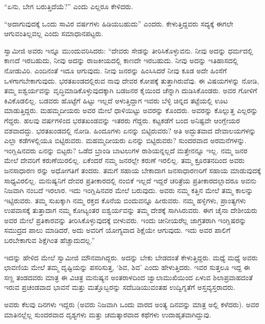 “ಏನು, ಬೇಗ ಬರುತ್ತಿದೆಯೆ?” ಎಂದು ಎಲ್ಲರೂ ಕೇಳಿದರು.

“ಅದಾಗುವುದಕ್ಕೆ ಒಂದು ಸಾವಿರ ವರ್ಷಗಳು ಹಿಡಿಯಬಹುದು” ಎಂದರು. ಕೇಳುತ್ತಿದ್ದವರು ಸದ್ಯಕ್ಕೆ ಈಗಲೇ ಆಗುವಂತಿಲ್ಲವಲ್ಲ ಎಂದು ಸಮಾಧಾನಪಟ್ಟರು.

ಸ್ವಾಮೀಜಿ ಅವರು ಇನ್ನೂ ಮುಂದುವರಿಸಿದರು: “ದೇವರು ಸೇಡನ್ನು ತೀರಿಸಿಕೊಳ್ಳುವನು. ನೀವು ಅದನ್ನು ಧರ್ಮದಲ್ಲಿ ಕಾಣದೆ ಇರಬಹುದು, ನೀವು ಅದನ್ನು ರಾಜಕೀಯದಲ್ಲಿ ಕಾಣದೇ ಇರಬಹುದು. ನೀವು ಅದನ್ನು ಇತಿಹಾಸದಲ್ಲಿ ನೋಡುವಿರಿ. ಎಂದಿನಂತೆ ಇದೂ ಆಗುವುದು. ನೀವು ಜನರನ್ನು ಹಿಂಸಿಸಿದರೆ ನೀವು ಕೂಡ ಅದೇ ಹಿಂಸೆಗೆ ಒಳಗಾಗಬೇಕಾಗುವುದು. ಭರತಖಂಡದಲ್ಲಿರುವ ನಾವು ದೇವರ ಕೋಪಕ್ಕೆ ತುತ್ತಾಗಿರುವೆವು. ಈ ವಿಷಯಗಳನ್ನು ನೋಡಿ, ತಮ್ಮ ಐಶ್ವರ್ಯವನ್ನು ವೃದ್ಧಿಮಾಡಿಕೊಳ್ಳುವುದಕ್ಕಾಗಿ ಬಡಜನರ ಕೈಯಿಂದ ಚೆನ್ನಾಗಿ ದುಡಿಸಿಕೊಂಡರು. ಅವರ ಗೋಳಿಗೆ ಕಿವಿಕೊಡಲಿಲ್ಲ. ಬಡವರು ಹೊಟ್ಟೆಗೆ ಹಿಟ್ಟು ಇಲ್ಲದೆ ಅಳುತ್ತಿದ್ದಾಗ ಇವರು ಬೆಳ್ಳಿ ಚಿನ್ನದ ತಟ್ಟೆಯಲ್ಲಿ ಊಟ ಮಾಡುತ್ತಿದ್ದರು. ಮಹಮ್ಮದೀಯರು ಅವರ ಮೇಲೆ ಧಾಳಿಯಿಟ್ಟು ಅವರನ್ನು ಕೊಂದರು. ಅವರನ್ನು ಕೊಲ್ಲುತ್ತ ಎಲ್ಲರನ್ನು ಗೆದ್ದರು. ಹಲವು ವರ್ಷಗಳಿಂದ ಭರತಖಂಡವನ್ನು ಇತರರು ಗೆದ್ದರು. ಕಟ್ಟಕಡೆಗೆ ಬಂದ ಅನಿಷ್ಟವೇ ಆಂಗ್ಲೇಯರ ವಶವಾದದ್ದು. ಭರತಖಂಡದಲ್ಲಿ ನೋಡಿ. ಹಿಂದೂಗಳು ಏನನ್ನು ಬಿಟ್ಟಿರುವರು? ಅತಿ ಅದ್ಭುತವಾದ ದೇವಾಲಯಗಳನ್ನು ಎಲ್ಲಾ ಕಡೆಗಳಲ್ಲಿಯೂ ಬಿಟ್ಟಿರುವರು. ಮಹಮ್ಮದೀಯರು ಏನನ್ನು ಬಿಟ್ಟಿರುವರು? ಸುಂದರವಾದ ಅರಮನೆಗಳನ್ನು. ಇಂಗ್ಲಿಷಿನವರು ಏನನ್ನು ಬಿಟ್ಟರು? ಒಡೆದ ಬ್ರಾಂಡಿ ಬಾಟಲುಗಳ ರಾಶಿಯನ್ನಲ್ಲದೆ ಮತ್ತೇನನ್ನೂ ಇಲ್ಲ. ನಮ್ಮ ಜನರ ಮೇಲೆ ದೇವರಿಗೆ ಕರುಣೆಯಿರಲಿಲ್ಲ. ಏಕೆಂದರೆ ನಮ್ಮ ಜನರಲ್ಲೇ ಕರುಣೆ ಇರಲಿಲ್ಲ. ತಮ್ಮ ಕ್ರೂರತನದಿಂದ ಅವರು ಜನಸಾಧಾರಣ ರನ್ನು ಅಧೋಗತಿಗೆ ತಂದರು. ತಮಗೆ ಸಹಾಯ ಬೇಕಾದಾಗ ಜನಸಾಧಾರಣರಿಗೆ ಸಹಾಯ ಮಾಡುವುದಕ್ಕೆ ಸಾಧ್ಯವಿರಲಿಲ್ಲ. ಮನುಷ್ಯನಿಗೆ ದೇವರ ಪ್ರತೀಕಾರದಲ್ಲಿ ನಂಬಿಕೆ ಇಲ್ಲದೆ ಇದ್ದರೆ ಚರಿತ್ರೆಯ ಪ್ರತೀಕಾರದಲ್ಲಾದರೂ ಅವನು ನಿಜವಾಗಿ ನಂಬದೆ ಇರಲಾರ. ಇದು ಇಂಗ್ಲಿಷಿನವರ ಮೇಲೆ ಬರುವುದು. ಅವರು ನಮ್ಮ ಕತ್ತಿನ ಮೇಲೆ ತಮ್ಮ ಕಾಲನ್ನು ಇಟ್ಟಿರುವರು. ತಮ್ಮ ಸುಖಕ್ಕಾಗಿ ನಮ್ಮ ರಕ್ತದ ಕೊನೆಯ ಬಿಂದುವನ್ನೂ ಹೀರುವರು. ನಮ್ಮ ಹಳ್ಳಿಗಳು, ಪ್ರಾಂತ್ಯಗಳು ಉಪವಾಸಕ್ಕೆ ತುತ್ತಾದಾಗ ನಮ್ಮ ಕೋಟ್ಯಂತರ ಐಶ್ವರ್ಯವನ್ನು ತಮ್ಮ ದೇಶಕ್ಕೆ ಸಾಗಿಸಿರುವರು. ಈಗ ಚೈನಾ ದೇಶೀಯರು ಅವರ ಮೇಲೆ ಪ್ರತಿಕಾರವನ್ನು ತೀರಿಸಿಕೊಳ್ಳುವುದಕ್ಕೆ ಬೀಳುವರು. ಇಂದು ಚೀನೀಯರೆಲ್ಲ ಜಾಗ್ರತರಾಗಿ ಇಂಗ್ಲಿಷರನ್ನು ಸಮುದ್ರದ ಪಾಲು ಮಾಡಿದರೆ, ಅದು ಅವರಿಗೆ ಯೋಗ್ಯವಾದ ಶಿಕ್ಷೆಯೇ ಆಗುವುದು. ಇದು ಅವರ ಪಾಲಿಗೆ ಬರಬೇಕಾಗುವ ಶಿಕ್ಷೆಗಿಂತ ಹೆಚ್ಚಾದುದಲ್ಲ.”

ಇದನ್ನು ಹೇಳಿದ ಮೇಲೆ ಸ್ವಾಮೀಜಿ ಮೌನವಾಗಿದ್ದರು. ಅದನ್ನು ಬೇಕು ಬೇಡದಂತೆ ಕೇಳುತ್ತಿದ್ದರು. ಮಧ್ಯೆ ಮಧ್ಯೆ ಅವರು ಛಾವಣಿಯ ಮೇಲೆ ತಮ್ಮ ದೃಷ್ಟಿಯನ್ನು ಪಸರಿಸುತ್ತ, ‘ಶಿವ, ಶಿವ’ ಎಂದು ಹೇಳುತ್ತಿದರು. ಇವರ ಸುತ್ತಲೂ ಇದ್ದ ಈ ಸಣ್ಣ ತಂಡದವರು ಮಾತ್ರ ಈ ವಿಚಿತ್ರ ಮನುಷ್ಯನ ಅಂತರಾಳದಿಂದ ಜ್ವಾಲಾಮುಖಿಯಿಂದ ಏಳುವ ಶಿಲಾಪ್ರವಾಹದಂತೆ ಇರುವ ಪ್ರಚಂಡವಾದ ಭಾವನೆ ಮತ್ತು ಮತ್ತೊಬ್ಬರನ್ನು ಸದೆಬಡಿಯುವಂತಹ ಉದ್ವಿಗ್ನತೆಗೆ ಅಸ್ತವ್ಯಸ್ತರಾದರು.

ಅವರು ಕೆಲವು ದಿನಗಳು ಇದ್ದರು (ಅವರು ನಿಜವಾಗಿ ಒಂದು ವಾರದ ಅಂತ್ಯ ದಿನವನ್ನು ಮಾತ್ರ ಅಲ್ಲಿ ಕಳೆದರು). ಅವರ ಮಾತಿನಲ್ಲೆಲ್ಲ ಸುಂದರವಾದ ದೃಶ್ಯಗಳು ಮತ್ತು ಚಮತ್ಕಾರವಾದ ಕಥೆಗಳು ಉದಾಹೃತವಾಗಿದ್ದುವು.

